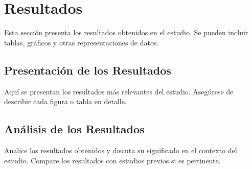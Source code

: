 \section{Resultados}

Esta sección presenta los resultados obtenidos en el estudio. Se pueden incluir tablas, gráficos y otras representaciones de datos.

\subsection{Presentación de los Resultados}

Aquí se presentan los resultados más relevantes del estudio. Asegúrese de describir cada figura o tabla en detalle.

\subsection{Análisis de los Resultados}

Analice los resultados obtenidos y discuta su significado en el contexto del estudio. Compare los resultados con estudios previos si es pertinente.

